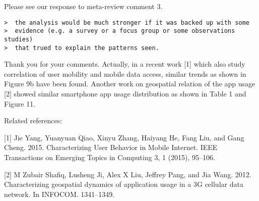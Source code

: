 Please see our response to meta-review comment 3.

\begin{verbatim}
>  the analysis would be much stronger if it was backed up with some
>  evidence (e.g. a survey or a focus group or some observations studies)
>  that trued to explain the patterns seen.
\end{verbatim}

Thank you for your comments. 
Actually, in a recent work [1] which also study correlation of user mobility and mobile data access, similar trends as shown in Figure 9b have been found. 
Another work on geospatial relation of the app usage [2] showed similar smartphone app usage distribution as shown in Table 1 and Figure 11.  

Related references:

[1] Jie Yang, Yuanyuan Qiao, Xinyu Zhang, Haiyang He, Fang Liu, and Gang Cheng. 2015. Characterizing User Behavior in Mobile Internet.
IEEE Transactions on Emerging Topics in Computing 3, 1 (2015), 95--106.

[2] M Zubair Shafiq, Lusheng Ji, Alex X Liu, Jeffrey Pang, and Jia Wang. 2012. Characterizing geospatial dynamics of application usage in a
3G cellular data network. In INFOCOM. 1341--1349.

